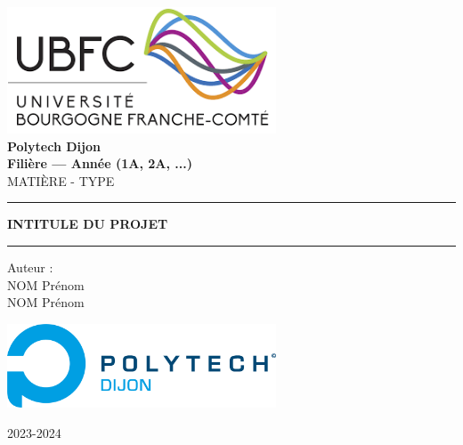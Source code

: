 \begin{center}
    
    \includegraphics[width=0.6\textwidth]{img/logo/UBFC.png}
    \Huge
    \vspace{2cm}
    \textbf{\\\vspace{0.4cm}Polytech Dijon\\ Filière — Année (1A, 2A, ...)}
    \vspace{0.75cm}
    \\MATIÈRE - TYPE

    \vspace{0.5cm}
    \color{polytech}\rule{\textwidth}{1pt}
    \begin{center}
        \vspace{0.3cm}
        \Huge
        \color{black}\textbf{INTITULE DU PROJET}   
    \end{center}
    \rule{\textwidth}{1pt}

    \vspace{0.5cm}
    \color{black}\Large 
    Auteur :\\
    NOM Prénom\\
    NOM Prénom\\
    \vspace{0.5cm}

    \includegraphics[width=0.6\textwidth]{img/logo/Polytech_Dijon.png}
        
    \vfill
    \Large
    2023-2024
            
\end{center}
\newpage
\begingroup
    \renewcommand{\contentsname}{Sommaire}
    \tableofcontents
    \renewcommand{\listfigurename}{Table des Figures}
    \listoffigures
\endgroup
\newpage